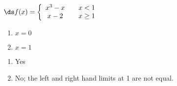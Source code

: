 {$\ds f(x) = \left\{\begin{array}{ccc} 
x^3-x		& & x<1\\
x-2 & & x\geq 1
\end{array}\right.
$
\begin{enumerate}
\item		$x=0$
\item		$x=1$
\end{enumerate}
}
{\begin{enumerate}
\item		Yes
\item		No; the left and right hand limits at 1 are not equal.
\end{enumerate}
}

